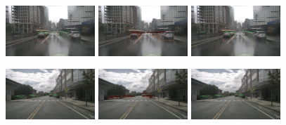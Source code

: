 \documentclass[report.tex]{subfiles}
\begin{document}
\begin{figure}[h!]
        \includegraphics[width=0.3\textwidth]{images/results/saf_vs_hrfuser/samples/s5_rain_reg/n008-2018-09-18-14-18-33-0400__CAM_FRONT__1537295031112404_gt.png}\hfill
        \includegraphics[width=0.3\textwidth]{images/results/saf_vs_hrfuser/samples/s5_rain_reg/n008-2018-09-18-14-18-33-0400__CAM_FRONT__1537295031112404_former.jpg}\hfill
        \includegraphics[width=0.3\textwidth]{images/results/saf_vs_hrfuser/samples/s5_rain_reg/n008-2018-09-18-14-18-33-0400__CAM_FRONT__1537295031112404.png}
      
        \includegraphics[width=0.3\textwidth]{images/results/saf_vs_hrfuser/samples/s1_small/n008-2018-08-01-15-34-25-0400__CAM_FRONT__1533152226912404_GT.png}\hfill
        \includegraphics[width=0.3\textwidth]{images/results/saf_vs_hrfuser/samples/s1_small/n008-2018-08-01-15-34-25-0400__CAM_FRONT__1533152226912404_former.jpg}\hfill
        \includegraphics[width=0.3\textwidth]{images/results/saf_vs_hrfuser/samples/s1_small/n008-2018-08-01-15-34-25-0400__CAM_FRONT__1533152226912404.png}
      

\end{figure}
\end{document}
